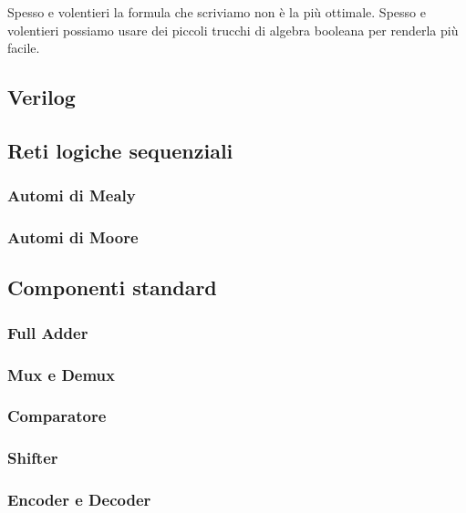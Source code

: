 Spesso e volentieri la formula che scriviamo non è la più ottimale. Spesso e volentieri  possiamo usare dei piccoli trucchi di algebra booleana per renderla più facile.

\subsection{Verilog}
\subsection{Reti logiche sequenziali}
\subsubsection{Automi di Mealy}
\subsubsection{Automi di Moore}
\subsection{Componenti standard}
\subsubsection{Full Adder}
\subsubsection{Mux e Demux}
\subsubsection{Comparatore}
\subsubsection{Shifter}
\subsubsection{Encoder e Decoder}
